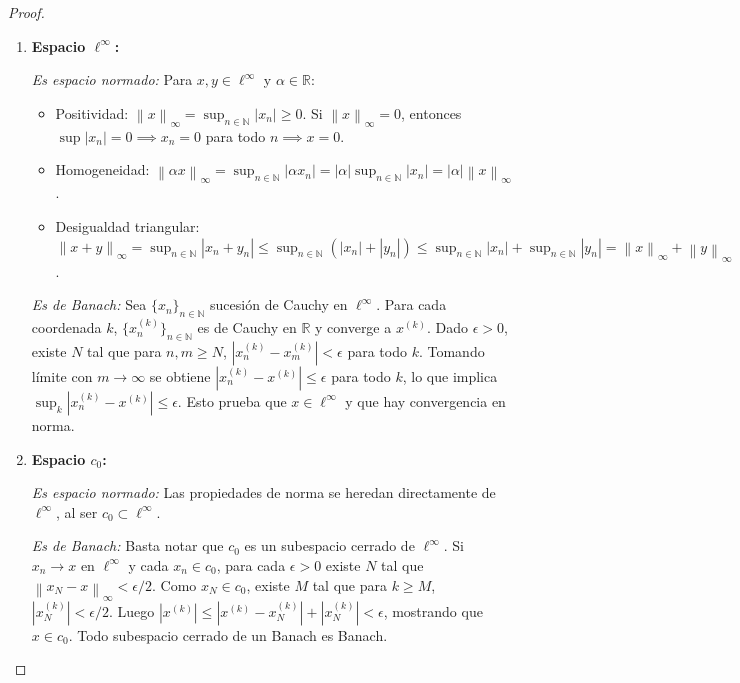 \documentclass{article}
\theoremstyle{definition}
\newcommand{\R}{\mathbb{R}}
\newcommand{\N}{\mathbb{N}}
\newcommand{\norm}[1]{\left\lVert #1 \right\rVert}       %
\begin{document}
\begin{proof}
\begin{enumerate}
        \item \textbf{Espacio \( \ell^\infty \):}

              \textit{Es espacio normado:}
              Para \( x, y \in \ell^\infty \) y \( \alpha \in \R \):
              \begin{itemize}
                  \item Positividad: \( \norm{x}_\infty = \sup_{n\in\N} |x_n| \geq 0 \). Si \( \norm{x}_\infty = 0 \), entonces \( \sup |x_n| = 0 \implies x_n = 0 \) para todo \( n \implies x = 0 \).
                  \item Homogeneidad: \( \norm{\alpha x}_\infty = \sup_{n\in\N} |\alpha x_n| = |\alpha| \sup_{n\in\N} |x_n| = |\alpha| \norm{x}_\infty \).
                  \item Desigualdad triangular: \( \norm{x+y}_\infty = \sup_{n\in\N} |x_n + y_n| \leq \sup_{n\in\N} (|x_n| + |y_n|) \leq \sup_{n\in\N} |x_n| + \sup_{n\in\N} |y_n| = \norm{x}_\infty + \norm{y}_\infty \).
              \end{itemize}

              \textit{Es de Banach:}
              Sea \( {\{x_n\}}_{n\in\N} \) sucesión de Cauchy en \( \ell^\infty \). Para cada coordenada \( k \), \( {\{x_n^{(k)}\}}_{n\in\N} \) es de Cauchy en \( \R \) y converge a \( x^{(k)} \).
              Dado \( \epsilon>0 \), existe \( N \) tal que para \( n,m \geq N \), \( |x_n^{(k)} - x_m^{(k)}| < \epsilon \) para todo \( k \). Tomando límite con \( m \to \infty \) se obtiene \( |x_n^{(k)} - x^{(k)}| \leq \epsilon \) para todo \( k \), lo que implica \( \sup_{k} |x_n^{(k)} - x^{(k)}| \leq \epsilon \). Esto prueba que \( x \in \ell^\infty \) y que hay convergencia en norma.

        \item \textbf{Espacio \( c_0 \):}

              \textit{Es espacio normado:} Las propiedades de norma se heredan directamente de \( \ell^\infty \), al ser \( c_0 \subset \ell^\infty \).

              \textit{Es de Banach:} Basta notar que \( c_0 \) es un subespacio cerrado de \( \ell^\infty \). Si \( x_n \to x \) en \( \ell^\infty \) y cada \( x_n \in c_0 \), para cada \( \epsilon>0 \) existe \( N \) tal que \( \norm{x_N - x}_\infty < \epsilon/2 \). Como \( x_N \in c_0 \), existe \( M \) tal que para \( k \geq M \), \( |x_N^{(k)}| < \epsilon/2 \). Luego \( |x^{(k)}| \leq |x^{(k)} - x_N^{(k)}| + |x_N^{(k)}| < \epsilon \), mostrando que \( x \in c_0 \). Todo subespacio cerrado de un Banach es Banach.


\end{enumerate}
\end{proof}
\end{document}
